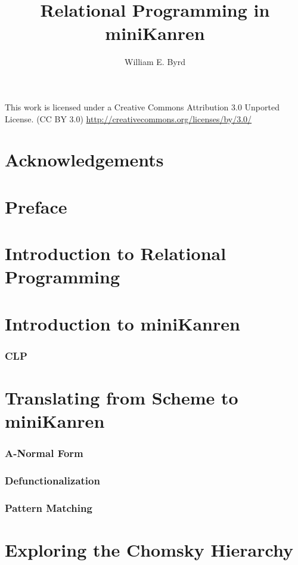 \documentclass[11pt]{book}
\begin{document}
\begin{schemeregion}

\title{Relational Programming in miniKanren}
\author{William E. Byrd}
\maketitle
\tableofcontents

\newpage
\huge
\ccLogo
\ccAttribution
This work is licensed under a Creative Commons Attribution 3.0 Unported License.
(CC BY 3.0) \url{http://creativecommons.org/licenses/by/3.0/}

\normalsize

\chapter{Acknowledgements}
\chapter{Preface}

\chapter{Introduction to Relational Programming}

\chapter{Introduction to miniKanren}
\subsection{CLP}

\chapter{Translating from Scheme to miniKanren}
\subsection{A-Normal Form}
\subsection{Defunctionalization}
\subsection{Pattern Matching}

\chapter{Exploring the Chomsky Hierarchy}

\end{schemeregion}
\end{document}

